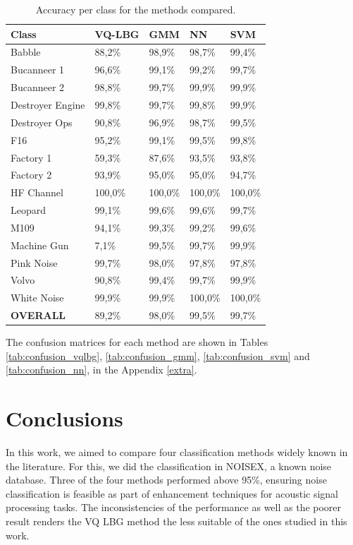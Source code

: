 \documentclass[12pt]{article}
\begin{document}
\begin{table}[ht]
\centering
\caption{Accuracy per class for the methods compared.}
\label{tab:acc}
\begin{tabular}{l|llll}
\hline
Class & VQ-LBG & GMM & NN & SVM \\
\hline
Babble & 88,2\% & 98,9\% & 98,7\% & 99,4\%  \\
Bucanneer 1 & 96,6\% & 99,1\% & 99,2\% & 99,7\% \\
Bucanneer 2 & 98,8\% & 99,7\% & 99,9\% & 99,9\% \\
Destroyer Engine & 99,8\% & 99,7\% & 99,8\% & 99,9\% \\
Destroyer Ops & 90,8\% & 96,9\% & 98,7\% & 99,5\% \\
F16 & 95,2\% & 99,1\% & 99,5\% & 99,8\%\\
Factory 1 & 59,3\% & 87,6\% & 93,5\% & 93,8\% \\
Factory 2 & 93,9\% & 95,0\% & 95,0\% & 94,7\%\\
HF Channel & 100,0\% & 100,0\% & 100,0\% & 100,0\%\\
Leopard & 99,1\% & 99,6\% & 99,6\% & 99,7\% \\
M109 & 94,1\% & 99,3\% & 99,2\% & 99,6\% \\
Machine Gun & 7,1\% & 99,5\% & 99,7\% & 99,9\% \\
Pink Noise & 99,7\% & 98,0\% & 97,8\% & 97,8\% \\
Volvo & 90,8\% & 99,4\% & 99,7\% & 99,9\% \\
White Noise & 99,9\% & 99,9\% & 100,0\% & 100,0\% \\
\hline
\textbf{OVERALL} & 89,2\% & 98,0\% & 99,5\% & 99,7\% \\
\hline
\end{tabular}
\end{table}

The confusion matrices for each method are shown in Tables \ref{tab:confusion_vqlbg}, \ref{tab:confusion_gmm}, \ref{tab:confusion_svm} and \ref{tab:confusion_nn}, in the Appendix \ref{extra}.

\section{Conclusions} \label{conc}

In this work, we aimed to compare four classification methods widely known in the literature. For this, we did the classification in NOISEX, a known noise database. Three of the four methods performed above 95\%, ensuring noise classification is feasible as part of enhancement techniques for acoustic signal processing tasks. The inconsistencies of the performance as well as the poorer result renders the VQ LBG method the less suitable of the ones studied in this work.
\end{document}
